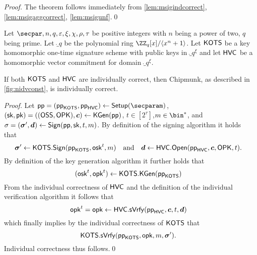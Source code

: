 \begin{proof}
  The theorem follows immediately from \autoref{lem:msigindcorrect}, \autoref{lem:msigaggcorrect}, \autoref{lem:msigunf}.\qed
\end{proof}

\begin{lemma}\label{lem:msigindcorrect}
  Let $\secpar,n,q,\varepsilon,\xi,\chi,\rho,\tau$ be positive integers with $n$ being a power of two, $q$ being prime.
Let $\ring_q$ be the polynomial ring $\ZZ_q[x]/\langle x^n+1\rangle$.
Let $\mathsf{KOTS}$ be a key homomorphic one-time signature scheme with public keys in $\ring_q^\xi$ and let $\mathsf{HVC}$ be a homomorphic vector commitment for domain $\ring_q^\xi$.

If both $\mathsf{KOTS}$ and $\mathsf{HVC}$ are individually correct, then Chipmunk, as described in \autoref{fig:nidvconst}, is individually correct.
\end{lemma}
\begin{proof}
  Let $\params=(\hotsparams,\hvcparams)\gets\setup(\secparam)$, $(\mathsf{sk},\mathsf{pk}) = ((\mathsf{OSS},\mathsf{OPK}),\boldsymbol{c})\gets\mathsf{KGen}(\mathsf{pp})$, $t\in[2^\tau]$,$m\in\bin^*$, and $\sigma = (\boldsymbol{\sigma}',\boldsymbol{d}) \gets \mathsf{Sign}(\mathsf{pp},\mathsf{sk},t,m)$.
  By definition of the signing algorithm it holds that
  \[
    \boldsymbol{\sigma}' \gets \mathsf{KOTS}.\mathsf{Sign}(\mathsf{pp}_{\mathsf{KOTS}},\mathsf{osk}^t,m) \quad \text{and} \quad \boldsymbol{d} \gets \mathsf{HVC}.\mathsf{Open}(\mathsf{pp}_{\mathsf{HVC}},\boldsymbol{c},\mathsf{OPK},t).
  \]
  By definition of the key generation algorithm it further holds that
  \[
    (\mathsf{osk}^t,\mathsf{opk}^t) \gets \mathsf{KOTS}.\mathsf{KGen}(\mathsf{pp}_{\mathsf{KOTS}})
  \]
  From the individual correctness of $\mathsf{HVC}$ and the definition of the individual verification algorithm it follows that
  \[
    \mathsf{opk}^t = \mathsf{opk} \gets \mathsf{HVC}.\mathsf{sVrfy}(\mathsf{pp}_{\mathsf{HVC}},\boldsymbol{c},t,\boldsymbol{d})
  \]
  which finally implies by the individual correctness of $\mathsf{KOTS}$ that
  \[
    \mathsf{KOTS}.\mathsf{sVrfy}(\mathsf{pp}_{\mathsf{KOTS}},\mathsf{opk},m,\boldsymbol{\sigma}').
  \]
  Individual correctness thus follows.\qed
\end{proof}

